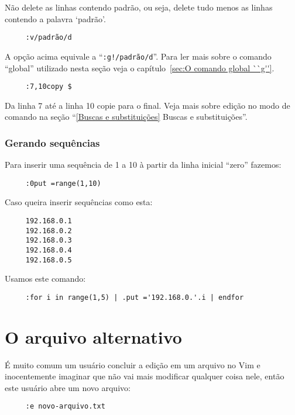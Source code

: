 Não delete as linhas contendo padrão, ou seja, delete tudo menos as linhas
contendo a palavra `padrão'. 

\begin{verbatim}
     :v/padrão/d
\end{verbatim}

A opção acima equivale a ``\verb+:g!/padrão/d+''.  Para ler mais sobre
o comando ``global'' utilizado nesta seção veja o capítulo~\ref{sec:O comando global ``g''}.

\begin{verbatim}
     :7,10copy $
\end{verbatim}

Da linha 7 até a linha 10 copie para o final. {\Large {}}
Veja mais sobre edição no modo de comando na seção ``\ref{Buscas e
substituições} Buscas e substituições''.

\subsubsection{Gerando sequências}
Para inserir uma sequência de 1 a 10 à partir da linha inicial ``zero'' fazemos:

\begin{verbatim}
     :0put =range(1,10)
\end{verbatim}

Caso queira inserir sequências como esta:

\begin{verbatim}
     192.168.0.1
     192.168.0.2
     192.168.0.3
     192.168.0.4
     192.168.0.5
\end{verbatim}

Usamos este comando:

\begin{verbatim}
     :for i in range(1,5) | .put ='192.168.0.'.i | endfor
\end{verbatim}

\section{O arquivo alternativo}
\label{O arquivo alternativo}

É muito comum um usuário concluir a edição em um arquivo no Vim e
inocentemente imaginar que não vai mais modificar qualquer coisa nele, então
este usuário abre um novo arquivo:

\begin{verbatim}
     :e novo-arquivo.txt
\end{verbatim}


